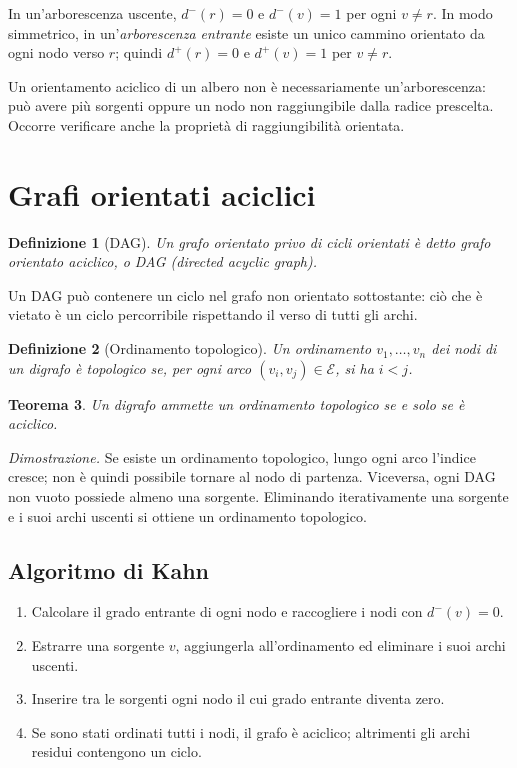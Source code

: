 \documentclass[11pt,a4paper]{article}
\newtheorem{definition}{Definizione}[section]
\newtheorem{theorem}[definition]{Teorema}
\newcommand{\E}{\mathcal{E}}
\begin{document}
In un'arborescenza uscente, $d^-(r)=0$ e $d^-(v)=1$ per ogni $v\neq r$. In modo simmetrico, in un'\emph{arborescenza entrante} esiste un unico cammino orientato da ogni nodo verso $r$; quindi $d^+(r)=0$ e $d^+(v)=1$ per $v\neq r$.

\begin{warningbox}
Un orientamento aciclico di un albero non è necessariamente un'arborescenza: può avere più sorgenti oppure un nodo non raggiungibile dalla radice prescelta. Occorre verificare anche la proprietà di raggiungibilità orientata.
\end{warningbox}

\section{Grafi orientati aciclici}

\begin{definition}[DAG]
Un grafo orientato privo di cicli orientati è detto \emph{grafo orientato aciclico}, o DAG (\emph{directed acyclic graph}).
\end{definition}

Un DAG può contenere un ciclo nel grafo non orientato sottostante: ciò che è vietato è un ciclo percorribile rispettando il verso di tutti gli archi.

\begin{definition}[Ordinamento topologico]
Un ordinamento $v_1,\ldots,v_n$ dei nodi di un digrafo è \emph{topologico} se, per ogni arco $(v_i,v_j)\in\E$, si ha $i<j$.
\end{definition}

\begin{theorem}
Un digrafo ammette un ordinamento topologico se e solo se è aciclico.
\end{theorem}

\emph{Dimostrazione.} Se esiste un ordinamento topologico, lungo ogni arco l'indice cresce; non è quindi possibile tornare al nodo di partenza. Viceversa, ogni DAG non vuoto possiede almeno una sorgente. Eliminando iterativamente una sorgente e i suoi archi uscenti si ottiene un ordinamento topologico.

\subsection{Algoritmo di Kahn}

\begin{enumerate}
\item Calcolare il grado entrante di ogni nodo e raccogliere i nodi con $d^-(v)=0$.
\item Estrarre una sorgente $v$, aggiungerla all'ordinamento ed eliminare i suoi archi uscenti.
\item Inserire tra le sorgenti ogni nodo il cui grado entrante diventa zero.
\item Se sono stati ordinati tutti i nodi, il grafo è aciclico; altrimenti gli archi residui contengono un ciclo.
\end{enumerate}
\end{document}
